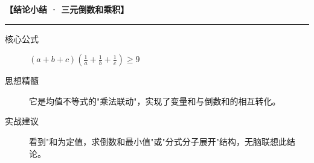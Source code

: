 \begin{summarybox}
\textbf{【结论小结 · 三元倒数和乘积】}
\vspace{0.8em}
\hrule
\vspace{0.8em}

\begin{description}
    \item[核心公式] $(a+b+c)(\frac{1}{a}+\frac{1}{b}+\frac{1}{c}) \geqslant 9$
    \item[思想精髓] 它是均值不等式的"乘法联动"，实现了变量和与倒数和的相互转化。
    \item[实战建议] 看到"和为定值，求倒数和最小值"或"分式分子展开"结构，无脑联想此结论。
\end{description}
\end{summarybox}